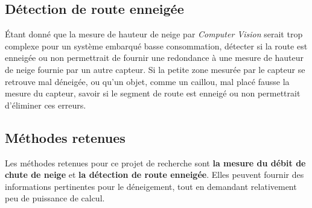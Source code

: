 \subsection{Détection de route enneigée}
Étant donné que la mesure de hauteur de neige par \emph{Computer Vision} serait trop complexe
pour un système embarqué basse consommation, détecter si la route est enneigée ou non
permettrait de fournir une redondance à une mesure de hauteur de neige fournie par un autre capteur.
Si la petite zone mesurée par le capteur se retrouve mal déneigée, ou qu'un objet, comme un caillou, mal placé
fausse la mesure du capteur, savoir si le segment de route est enneigé ou non permettrait d'éliminer ces erreurs.

\subsection{Méthodes retenues}
Les méthodes retenues pour ce projet de recherche sont \textbf{la mesure du débit de chute de neige}
et \textbf{la détection de route enneigée}. Elles peuvent fournir des informations pertinentes
pour le déneigement, tout en demandant relativement peu de puissance de calcul.
\newpage